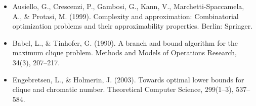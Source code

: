 \documentclass{article}
\begin{document}
\begin{itemize}\itemsep .125cm
	\item Ausiello, G., Crescenzi, P., Gambosi, G., Kann, V., Marchetti-Spaccamela, A., \& Protasi, M. (1999). Complexity and approximation: Combinatorial optimization problems and their approximability properties. Berlin: Springer.
	\item Babel, L., \& Tinhofer, G. (1990). A branch and bound algorithm for the maximum clique problem. Methods and Models of Operations Research, 34(3), 207–217.
	\item Engebretsen, L., \& Holmerin, J. (2003). Towards optimal lower bounds for clique and chromatic number. Theoretical Computer Science, 299(1–3), 537–584.
\end{itemize}

\ifx\onefile\undefined
	
\end{document}
